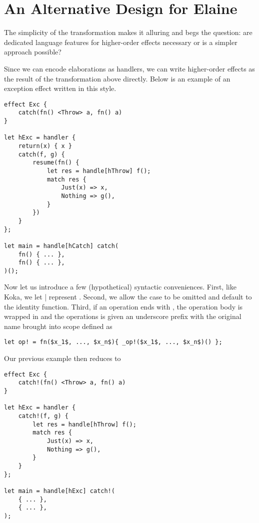 \section{An Alternative Design for Elaine}

The simplicity of the transformation makes it alluring and begs the question: are dedicated language features for higher-order effects necessary or is a simpler approach possible?

Since we can encode elaborations as handlers, we can write higher-order effects as the result of the transformation above directly. Below is an example of an exception effect written in this style.

\begin{lstlisting}[language=elaine,style=fancy]
effect Exc {
    catch(fn() <Throw> a, fn() a)
}

let hExc = handler {
    return(x) { x }
    catch(f, g) {
        resume(fn() {
            let res = handle[hThrow] f();
            match res {
                Just(x) => x,
                Nothing => g(),
            }
        })
    }
};

let main = handle[hCatch] catch(
    fn() { ... },
    fn() { ... },
)();
\end{lstlisting}

Now let us introduce a few (hypothetical) syntactic conveniences. First, like Koka, we let | represent . Second, we allow the  case to be omitted and default to the identity function. Third, if an operation ends with \el{!}, the operation body is wrapped in  and the operations is given an underscore prefix with the original name brought into scope defined as

\begin{lstlisting}[language=elaine,style=fancy]
let op! = fn($x_1$, ..., $x_n$){ _op!($x_1$, ..., $x_n$)() };
\end{lstlisting}

Our previous example then reduces to

\begin{lstlisting}[language=elaine,style=fancy]
effect Exc {
    catch!(fn() <Throw> a, fn() a)
}

let hExc = handler {
    catch!(f, g) {
        let res = handle[hThrow] f();
        match res {
            Just(x) => x,
            Nothing => g(),
        }
    }
};

let main = handle[hExc] catch!(
    { ... },
    { ... },
);
\end{lstlisting}

